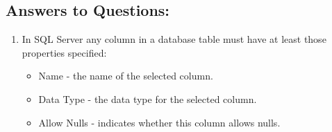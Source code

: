 \documentclass[12pt]{article}
\begin{document}
        \subsection*{Answers to Questions:}
        \begin{enumerate}
                \item In SQL Server any column in a database table must have at least those properties specified:
                \begin{itemize}
                        
                        \item Name - the name of the selected column.
                        \item Data Type - the data type for the selected column.
                        \item Allow Nulls - indicates whether this column allows nulls.


\end{itemize}
\end{enumerate}
\end{document}
